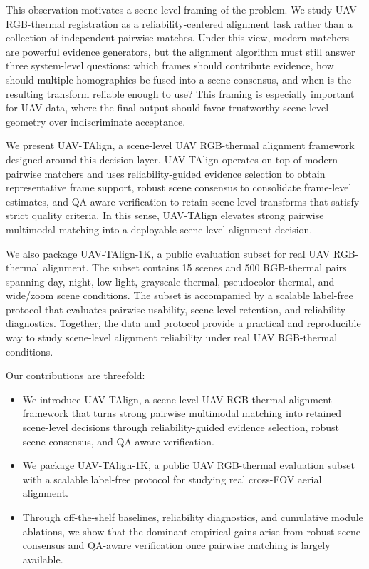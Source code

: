 This observation motivates a scene-level framing of the problem. We study UAV RGB-thermal
registration as a reliability-centered alignment task rather than a collection of independent
pairwise matches. Under this view, modern matchers are powerful evidence generators,
but the alignment algorithm must still answer three system-level questions: which frames should
contribute evidence, how should multiple homographies be fused into a scene consensus, and when is
the resulting transform reliable enough to use? This framing is especially important for UAV data,
where the final output should favor trustworthy scene-level geometry over indiscriminate
acceptance.

We present UAV-TAlign, a scene-level UAV RGB-thermal alignment framework designed around this
decision layer. UAV-TAlign operates on top of modern pairwise matchers and uses
reliability-guided evidence selection to obtain representative frame support, robust scene
consensus to consolidate frame-level estimates, and QA-aware verification to retain scene-level
transforms that satisfy strict quality criteria. In this sense, UAV-TAlign elevates strong pairwise
multimodal matching into a deployable scene-level alignment decision.

We also package UAV-TAlign-1K, a public evaluation subset for real UAV RGB-thermal alignment. The
subset contains 15 scenes and 500 RGB-thermal pairs spanning day, night, low-light, grayscale
thermal, pseudocolor thermal, and wide/zoom scene conditions. The subset is accompanied by a
scalable label-free protocol that evaluates pairwise usability, scene-level retention, and
reliability diagnostics. Together, the data and protocol provide a practical and reproducible way
to study scene-level alignment reliability under real UAV RGB-thermal conditions.

Our contributions are threefold:
\begin{itemize}
\item We introduce UAV-TAlign, a scene-level UAV RGB-thermal alignment framework that turns strong
pairwise multimodal matching into retained scene-level decisions through reliability-guided
evidence selection, robust scene consensus, and QA-aware verification.
\item We package UAV-TAlign-1K, a public UAV RGB-thermal evaluation subset with a scalable
label-free protocol for studying real cross-FOV aerial alignment.
\item Through off-the-shelf baselines, reliability diagnostics, and cumulative module ablations, we
show that the dominant empirical gains arise from robust scene consensus and QA-aware verification
once pairwise matching is largely available.
\end{itemize}
